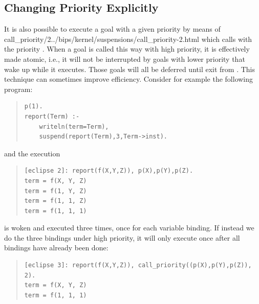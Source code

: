 \subsection{Changing Priority Explicitly}
It is also possible to execute a goal with a given priority
by means of
%
{call_priority/2}{../bips/kernel/suspensions/call_priority-2.html}
which calls  with the priority .
When a goal is called this way with high priority, it is effectively
made atomic, i.e., it will not be interrupted by goals with lower priority
that wake up while it executes.
Those goals will all be deferred until exit from
.
This technique can sometimes improve efficiency.
Consider for example the following program:
\begin{quote}
\begin{verbatim}
p(1).
report(Term) :-
    writeln(term=Term),
    suspend(report(Term),3,Term->inst).
\end{verbatim}
\end{quote}
and the execution
\begin{quote}
\begin{verbatim}
[eclipse 2]: report(f(X,Y,Z)), p(X),p(Y),p(Z).
term = f(X, Y, Z)
term = f(1, Y, Z)
term = f(1, 1, Z)
term = f(1, 1, 1)
\end{verbatim}
\end{quote}
 is woken and executed three times, once for each variable
binding.
If instead we do the three bindings under high priority, it will only
execute once after all bindings have already been done:
\begin{quote}
\begin{verbatim}
[eclipse 3]: report(f(X,Y,Z)), call_priority((p(X),p(Y),p(Z)), 2).
term = f(X, Y, Z)
term = f(1, 1, 1)
\end{verbatim}
\end{quote}


